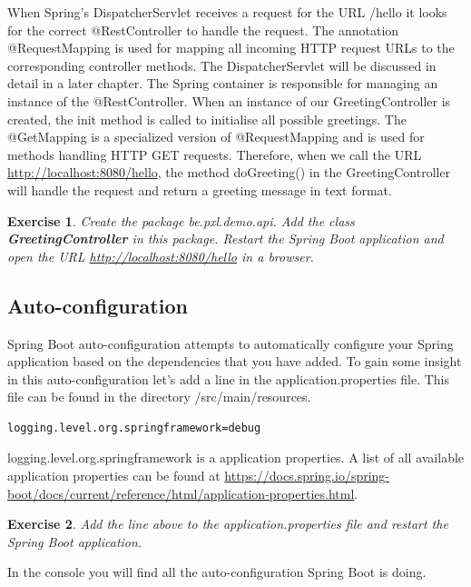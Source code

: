 \documentclass[a4paper, 12pt]{report}
\newenvironment{boxexercise}
{\begin{tcolorbox}
[enhanced jigsaw,breakable,pad at break*=1mm,
 colback=tsyellow!20,boxrule=0pt,frame hidden]}
{\end{tcolorbox}}
\newtheorem{envoefening}{\textbf{Exercise}}[chapter]
\newenvironment{oefening}
               {\begin{boxexercise}\begin{envoefening}}
               {\end{envoefening}\end{boxexercise}}
\begin{document}
When Spring's DispatcherServlet receives a request for the URL /hello it looks for the correct @RestController to handle the request. The annotation @RequestMapping is used for mapping all incoming HTTP request URLs to the corresponding controller methods. The DispatcherServlet will be discussed in detail in a later chapter. The Spring container is responsible for managing an instance of the @RestController. When an instance of our GreetingController is created,  the init method is called to initialise all possible greetings.  The @GetMapping is a specialized version of @RequestMapping and is used for methods handling HTTP  GET requests.  Therefore, when we call the URL \url{http://localhost:8080/hello}, the method doGreeting() in the GreetingController will handle the request and return a greeting message in text format.

\begin{oefening}
Create the package \textit{be.pxl.demo.api}. Add the class \textbf{GreetingController} in this package. Restart the Spring Boot application and open the URL \url{http://localhost:8080/hello} in a browser.
\end{oefening}

\subsection{Auto-configuration}

Spring Boot auto-configuration attempts to automatically configure your Spring application based on the dependencies that you have added.
To gain some insight in this auto-configuration let's add a line in the application.properties file. This file can be found in the directory /src/main/resources. 

\begin{lstlisting}
logging.level.org.springframework=debug
\end{lstlisting}

logging.level.org.springframework is a application properties. A list of all available application properties can be found at \url{https://docs.spring.io/spring-boot/docs/current/reference/html/application-properties.html}.

\begin{oefening}
Add the line above to the application.properties file and restart the Spring Boot application.
\end{oefening}

In the console you will find all the auto-configuration Spring Boot is doing.
\end{document}
